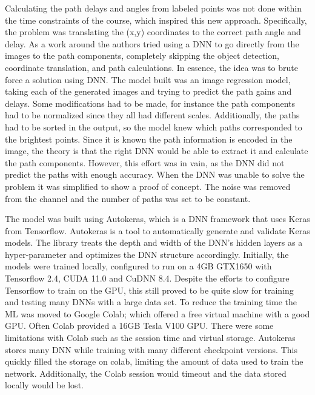 Calculating the path delays and angles from labeled points was not done within the time constraints of the course, which inspired this new approach. Specifically, the problem was translating the (x,y) coordinates to the correct path angle and delay. As a work around the authors tried using a DNN to go directly from the images to the path components, completely skipping the object detection, coordinate translation, and path calculations. In essence, the idea was to brute force a solution using DNN. The model built was an image regression model, taking each of the generated images and trying to predict the path gains and delays. Some modifications had to be made, for instance the path components had to be normalized since they all had different scales. Additionally, the paths had to be sorted in the output, so the model knew which paths corresponded to the brightest points. Since it is known the path information is encoded in the image, the theory is that the right DNN would be able to extract it and calculate the path components. However, this effort was in vain, as the DNN did not predict the paths with enough accuracy. When the DNN was unable to solve the problem it was simplified to show a proof of concept. The noise was removed from the channel and the number of paths was set to be constant. 

The model was built using Autokeras, which is a DNN framework that uses Keras from Tensorflow. Autokeras is a tool to automatically generate and validate Keras models. The library treats the depth and width of the DNN's hidden layers as a hyper-parameter and optimizes the DNN structure accordingly. Initially, the models were trained locally, configured to run on a 4GB GTX1650 with Tensorflow 2.4, CUDA 11.0 and CuDNN 8.4. Despite the efforts to configure Tensorflow to train on the GPU, this still proved to be quite slow for training and testing many DNNs with a large data set. To reduce the training time the ML was moved to Google Colab; which offered a free virtual machine with a good GPU. Often Colab provided a 16GB Tesla V100 GPU. There were some limitations with Colab such as the session time and virtual storage. Autokeras stores many DNN while training with many different checkpoint versions. This quickly filled the storage on colab, limiting the amount of data used to train the network. Additionally, the Colab session would timeout and the data stored locally would be lost. 

